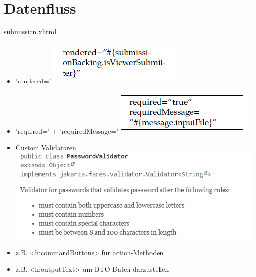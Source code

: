 \documentclass{beamer}
\begin{document}
    \section{Datenfluss}
    \begin{frame}{submission.xhtml}
        \begin{itemize}
            \item 'rendered='
            \centering
            \includegraphics[height=1.1\textheight]{graphics/facelet/fac_rendered}

            \item 'required=' + 'requiredMessage='
            \centering
            \includegraphics[height=1.1\textheight]{graphics/facelet/fac_required}

            \item Custom Validatoren
            \centering
            \includegraphics[height=1.1\textheight]{graphics/facelet/doc_validator}

            \item z.B. <h:commandButtons> für action-Methoden %
            \item z.B. <h:outputText> um DTO-Daten darzustellen %


\end{itemize}
\end{frame}
\end{document}
